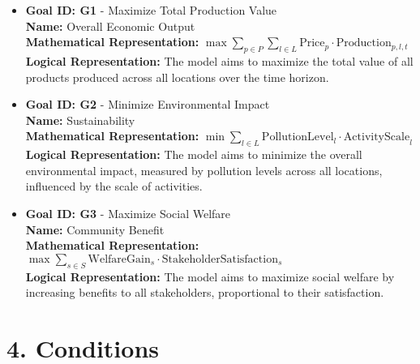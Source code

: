 \documentclass{article}
\begin{document}
\begin{itemize}
    \item \textbf{Goal ID: G1} - Maximize Total Production Value \\
    \textbf{Name:} Overall Economic Output \\
    \textbf{Mathematical Representation:} $\max \sum_{p \in P} \sum_{l \in L} \text{Price}_p \cdot \text{Production}_{p,l,t}$ \\
    \textbf{Logical Representation:}  The model aims to maximize the total value of all products produced across all locations over the time horizon.

    \item \textbf{Goal ID: G2} - Minimize Environmental Impact \\
    \textbf{Name:} Sustainability \\
    \textbf{Mathematical Representation:} $\min \sum_{l \in L} \text{PollutionLevel}_l \cdot \text{ActivityScale}_l$ \\
    \textbf{Logical Representation:} The model aims to minimize the overall environmental impact, measured by pollution levels across all locations, influenced by the scale of activities.

    \item \textbf{Goal ID: G3} - Maximize Social Welfare \\
    \textbf{Name:}  Community Benefit \\
    \textbf{Mathematical Representation:} $\max \sum_{s \in S} \text{WelfareGain}_s \cdot \text{StakeholderSatisfaction}_s$ \\
    \textbf{Logical Representation:} The model aims to maximize social welfare by increasing benefits to all stakeholders, proportional to their satisfaction.
\end{itemize}

\section{4. Conditions}
\end{document}
